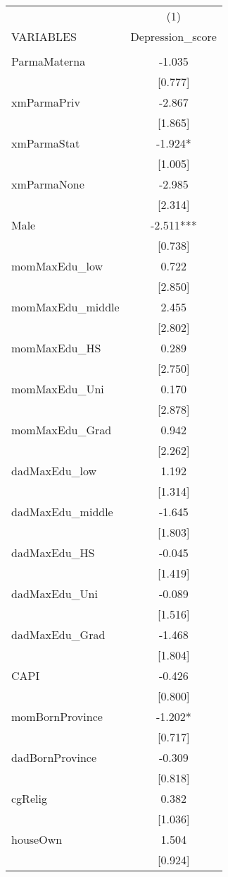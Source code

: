 \documentclass[]{article}
\begin{document}
\begin{tabular}{lc} \hline
 & (1) \\
VARIABLES & Depression\_score \\ \hline
 &  \\
ParmaMaterna & -1.035 \\
 & [0.777] \\
xmParmaPriv & -2.867 \\
 & [1.865] \\
xmParmaStat & -1.924* \\
 & [1.005] \\
xmParmaNone & -2.985 \\
 & [2.314] \\
Male & -2.511*** \\
 & [0.738] \\
momMaxEdu\_low & 0.722 \\
 & [2.850] \\
momMaxEdu\_middle & 2.455 \\
 & [2.802] \\
momMaxEdu\_HS & 0.289 \\
 & [2.750] \\
momMaxEdu\_Uni & 0.170 \\
 & [2.878] \\
momMaxEdu\_Grad & 0.942 \\
 & [2.262] \\
dadMaxEdu\_low & 1.192 \\
 & [1.314] \\
dadMaxEdu\_middle & -1.645 \\
 & [1.803] \\
dadMaxEdu\_HS & -0.045 \\
 & [1.419] \\
dadMaxEdu\_Uni & -0.089 \\
 & [1.516] \\
dadMaxEdu\_Grad & -1.468 \\
 & [1.804] \\
CAPI & -0.426 \\
 & [0.800] \\
momBornProvince & -1.202* \\
 & [0.717] \\
dadBornProvince & -0.309 \\
 & [0.818] \\
cgRelig & 0.382 \\
 & [1.036] \\
houseOwn & 1.504 \\
 & [0.924] \\

\end{tabular}
\end{document}
